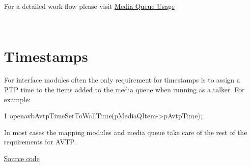 For a detailed work flow please visit \hyperlink{sdk_notes_media_queue_usage}{Media Queue Usage}

~\newline
\hypertarget{sdk_avtp_interface_module_dev_sdk_avtp_intf_module_timestamps}{}\section{Timestamps }\label{sdk_avtp_interface_module_dev_sdk_avtp_intf_module_timestamps}
For interface modules often the only requirement for timestamps is to assign a P\+TP time to the items added to the media queue when running as a talker. For example\+: 
\begin{DoxyCode}
1 openavbAvtpTimeSetToWallTime(pMediaQItem->pAvtpTime);
\end{DoxyCode}
 In most cases the mapping modules and media queue take care of the rest of the requirements for A\+V\+TP.

\hyperlink{openavb_intf_echo_8c-example}{Source code} 